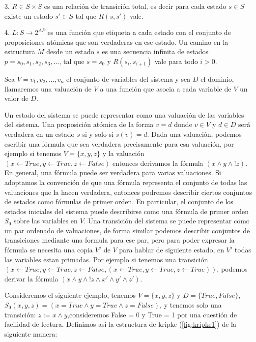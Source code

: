 3. $R \in S \times S$ es una relación de transición total, es decir para cada estado $s \in S$ existe un estado $s' \in S$ tal que $R(s,s')$ vale.

4. $L \colon S \to 2^{AP}$ es una función que etiqueta a cada estado con el conjunto de proposiciones atómicas que son verdaderas en ese estado.
Un camino en la estructura $M$ desde un estado $s$ es una secuencia infinita de estados $p = s_{0}, s_{1}, s_{2}, s_{3}, ...$, tal que $s = s_{0}$ y $R(s_{i},s_{i+1})$ vale para todo $i>0$.

Sea $V = {v_{1}, v_{2}, ..., v_{n}}$ el conjunto de variables del sistema y sea $D$ el dominio, llamaremos una valuación de $V$ a una función que asocia a cada variable de $V$ un valor de $D$.

Un estado del sistema se puede representar como una valuación de las variables del sistema. Una proposición atómica de la forma $v = d$ donde $v \in V$ y $d \in D$ será verdadera en un estado $s$ si y solo si $s(v) = d$.
Dada una valuación, podemos escribir una fórmula que sea verdadera precisamente para esa valuación, por ejemplo si tenemos $V = \{x,y,z\}$ y la valuación $(x \gets True, y \gets True, z \gets False)$ entonces derivamos la fórmula $(x \land y \land !z)$. En general, una fórmula puede ser verdadera para varias valuaciones. Si adoptamos la convención de que una fórmula representa el conjunto de todas las valuaciones que la hacen verdadera, entonces podremos describir ciertos conjuntos de estados como fórmulas de primer orden.
En particular, el conjunto de los estados iniciales del sistema puede describirse como una fórmula de primer orden $S_{0}$ sobre las variables en $V$.
Una transición del sistema se puede representar como un par ordenado de valuaciones, de forma similar podemos describir conjuntos de transiciones mediante una formula para ese par, pero para poder expresar la fórmula se necesita una copia $V'$ de $V$ para hablar de siguiente estado, en $V'$ todas las variables estan primadas. Por ejemplo si tenemos una transición $(x \gets True, y \gets True, z \gets False,(x \gets True, y \gets True, z \gets True))$, podemos derivar la fórmula $(x \land y \land !z \land x' \land y' \land z')$.

Consideremos el siguiente ejemplo, tenemos $V = \{x,y,z\}$ y $D = \{True, False\}$, $S_{0} (x,y,z) = (x= True \land y = True \land z = False)$, y tenemos solo una transición: $z := x \land y$,consideremos False = 0 y True = 1 por una cuestión de facilidad de lectura. Definimos asi la estructura de kripke (\ref{fig:kripke1})  de la siguiente manera:

